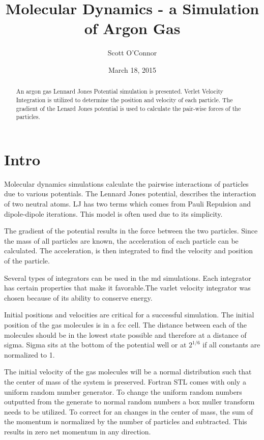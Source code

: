 \documentclass[10pt,a4paper]{article}
\title{Molecular Dynamics - a Simulation of Argon Gas}
\date{March 18, 2015}
\author{Scott O'Connor}
\begin{document}
\maketitle

\begin{abstract}
	An argon gas Lennard Jones Potential simulation is presented. Verlet Velocity Integration is utilized to determine the position and velocity of each particle. The gradient of the Lenard Jones potential is used to calculate the pair-wise forces of the particles. 
\end{abstract}

\section{Intro}
Molecular dynamics simulations calculate the pairwise interactions of particles due to various potentials. The Lennard Jones potential, describes the interaction of two neutral atoms. LJ has two terms which comes from Pauli Repulsion and dipole-dipole iterations. This model is often used due to its simplicity.

The gradient of the potential results in the force between the two particles. Since the mass of all particles are known, the acceleration of each particle can be calculated. The acceleration, is then integrated to find the velocity and position of the particle.

Several types of integrators can be used in the md simulations. Each integrator has certain properties that make it favorable.The varlet velocity integrator was chosen because of its ability to conserve energy. 

Initial positions and velocities are critical for a successful simulation. The initial position of the gas molecules is in a fcc cell. The distance between each of the molecules should be in the lowest state possible and therefore at a distance of sigma. Sigma sits at the bottom of the potential well or at $2^{1/6}$ if all constants are normalized to 1.

The initial velocity of the gas molecules will be a normal distribution such that the center of mass of the system is preserved. Fortran STL comes with only a uniform random number generator. To change the uniform random numbers outputted from the generate to normal random numbers a box muller transform needs to be utilized. To correct for an changes in the center of mass, the sum of the momentum is normalized by the number of particles and subtracted. This results in zero net momentum in any direction.
\end{document}
